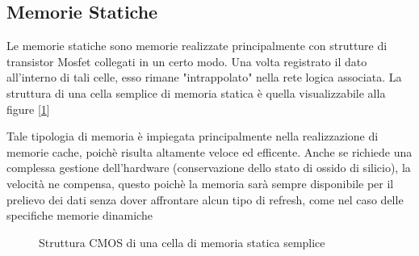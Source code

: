 \subsection{Memorie Statiche}
Le memorie statiche sono memorie realizzate principalmente con strutture di transistor Mosfet collegati in un certo modo. Una volta registrato il dato all'interno di tali celle, esso rimane "intrappolato" nella rete logica associata. La struttura di una cella semplice di memoria statica è quella visualizzabile alla figure [\ref{img:memoria-statica}]

Tale tipologia di memoria è impiegata principalmente nella realizzazione di memorie cache, poichè risulta altamente veloce ed efficente. Anche se richiede una complessa gestione dell'hardware (conservazione dello stato di ossido di silicio), la velocità ne compensa, questo poichè la memoria sarà sempre disponibile per il prelievo dei dati senza dover affrontare alcun tipo di refresh, come nel caso delle specifiche memorie dinamiche

\begin{figure}
    \centering
    \quad
    \caption{Struttura CMOS di una cella di memoria statica semplice}\label{img:memoria-statica}
\end{figure}
